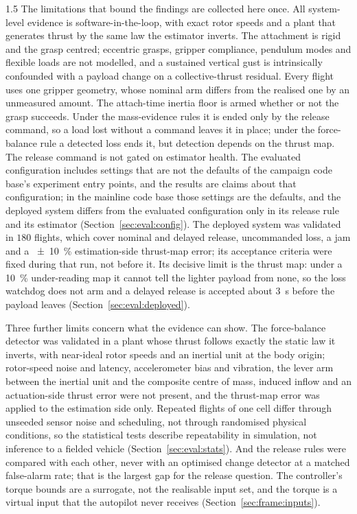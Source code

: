 \begin{spacing}{1.5}
The limitations that bound the findings are collected here once. All
system-level evidence is software-in-the-loop, with exact rotor speeds and a plant
that generates thrust by the same law the estimator inverts. The attachment is
rigid and the grasp centred; eccentric grasps, gripper compliance, pendulum
modes and flexible loads are not modelled, and a sustained vertical gust is
intrinsically confounded with a payload change on a collective-thrust residual.
Every flight uses one gripper geometry, whose nominal arm differs from the
realised one by an unmeasured amount. The attach-time inertia floor is armed
whether or not the grasp succeeds. Under the mass-evidence rules it is ended
only by the release command, so a load lost without a command leaves it in
place; under the force-balance rule a detected loss ends it, but detection
depends on the thrust map. The release command is not gated on estimator
health. The evaluated configuration includes settings that are not
the defaults of the campaign code base's experiment entry points, and the results
are claims about that configuration; in the mainline code base those settings are
the defaults, and the deployed system differs from the evaluated configuration
only in its release rule and its estimator (Section~\ref{sec:eval:config}). The
deployed system was validated in $180$ flights, which cover nominal and delayed
release, uncommanded loss, a jam and a \SI{\pm10}{\percent} estimation-side
thrust-map error; its acceptance criteria were fixed during that run, not before
it. Its decisive limit is the thrust map: under a \SI{10}{\percent}
under-reading map it cannot tell the lighter payload from none, so the loss
watchdog does not arm and a delayed release is accepted about \SI{3}{\second}
before the payload leaves (Section~\ref{sec:eval:deployed}).

Three further limits concern what the evidence can show. The force-balance
detector was validated in a plant whose thrust follows exactly the static law it
inverts, with near-ideal rotor speeds and an inertial unit at the body origin;
rotor-speed noise and latency, accelerometer bias and vibration, the lever arm
between the inertial unit and the composite centre of mass, induced inflow and
an actuation-side thrust error were not present, and the thrust-map error was
applied to the estimation side only. Repeated flights of one cell differ through
unseeded sensor noise and scheduling, not through randomised physical
conditions, so the statistical tests describe repeatability in simulation, not
inference to a fielded vehicle (Section~\ref{sec:eval:stats}). And the release
rules were compared with each other, never with an optimised change detector at
a matched false-alarm rate; that is the largest gap for the release question.
The controller's torque bounds are a surrogate, not the realisable input set,
and the torque is a virtual input that the autopilot never receives
(Section~\ref{sec:frame:inputs}).


\end{spacing}

